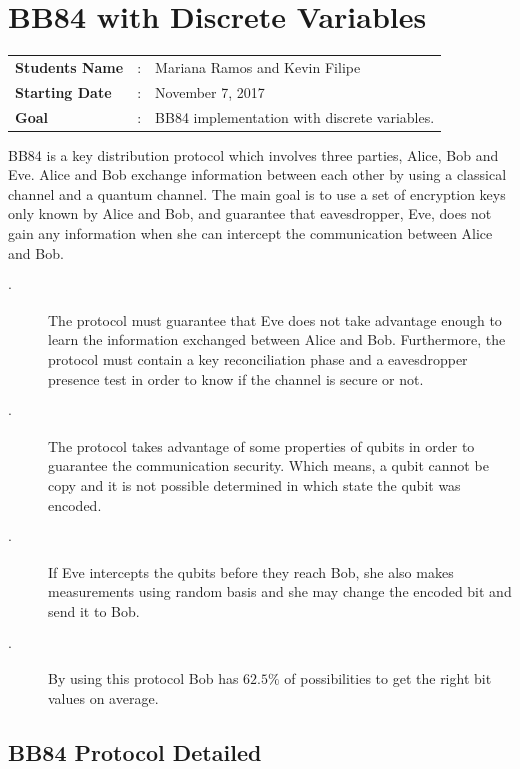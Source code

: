 \clearpage
\section{BB84 with Discrete Variables}

\begin{tcolorbox}	
\begin{tabular}{p{2.75cm} p{0.2cm} p{10.5cm}} 	
\textbf{Students Name}  &:& Mariana Ramos and Kevin Filipe\\
\textbf{Starting Date} &:& November 7, 2017\\
\textbf{Goal}          &:& BB84 implementation with discrete variables.
\end{tabular}
\end{tcolorbox}

BB84 is a key distribution protocol which involves three parties, Alice, Bob and Eve. Alice and Bob exchange information between each other by using a classical channel and a quantum channel. The main goal is to use a set of encryption keys only known by Alice and Bob, and guarantee that eavesdropper, Eve, does not gain any information when she can intercept the communication between Alice and Bob.

\begin{description}
  \item[$\cdot$] The protocol must guarantee that Eve does not take advantage enough to learn the information exchanged between Alice and Bob. Furthermore, the protocol must contain a key reconciliation phase and a eavesdropper presence test in order to know if the channel is secure or not.
  \item[$\cdot$] The protocol takes advantage of some properties of qubits in order to guarantee the communication security. Which means, a qubit cannot be copy and it is not possible determined in which state the qubit was encoded.
  \item[$\cdot$] If Eve intercepts the qubits before they reach Bob, she also makes measurements using random basis and she may change the encoded bit and send it to Bob.
  \item[$\cdot$] By using this protocol Bob has $62.5\%$ of possibilities to get the right bit values on average.
\end{description}


\subsection{BB84 Protocol Detailed}

